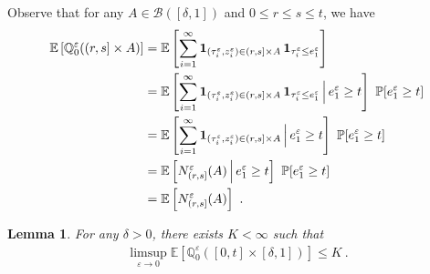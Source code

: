\documentclass[reqno, 12pt, a4paper]{amsart}
\theoremstyle{plain}
\newtheorem{lemma}[theorem]{Lemma}
\theoremstyle{definition}
\begin{document}
Observe that for any $ A \in {\mathcal B} ([\delta, 1])$ and $0\le r\le s \le t$, we have 
\begin{equation}
\label{eq:additivity}
\begin{split}
\mathbb E \left[ \mathbb Q_0^\varepsilon ((r,s] \times A) \right] & = \mathbb E \left[ \sum_{i=1}^\infty {\bf 1}_{(\tau_i^\varepsilon, z_i^\varepsilon) \in (r,s] \times A} \, {\bf 1}_{\tau_i^\varepsilon \le e_1^\varepsilon} \right] \\
& =\mathbb E \left[ \sum_{i=1}^\infty {\bf 1}_{(\tau_i^\varepsilon, z_i^\varepsilon) \in (r,s] \times A} \, {\bf 1}_{\tau_i^\varepsilon \le e_1^\varepsilon} \, \Big \vert \, e_1^ \varepsilon \ge t \right] \ \mathbb P [e_1^\varepsilon \ge t ] \\
& =\mathbb E \left[ \sum_{i=1}^\infty {\bf 1}_{(\tau_i^\varepsilon, z_i^\varepsilon) \in (r,s] \times A} \, \Big \vert \, e_1^ \varepsilon \ge t \right] \ \mathbb P [e_1^\varepsilon \ge t ] \\
&=\mathbb E \left[ N^\varepsilon_{(r,s]} (A)  \, \Big \vert \, e_1^ \varepsilon \ge t \right] \ \mathbb P [e_1^\varepsilon \ge t ] \\
&= \mathbb E \left[ N^\varepsilon_{(r,s]} (A) \right] \ . 
\end{split}
\end{equation}


\begin{lemma}
\label{lem:tight}
For any $\delta>0$, there exists $K<\infty$ such that 
\begin{equation}
\label{eq:UI}
\begin{split}
\limsup_{\varepsilon \to 0} \mathbb E \left[ \mathbb Q_0^\varepsilon ([0,t] \times [\delta,1]) \right] \le K  \ .
\end{split}
\end{equation}
\end{lemma}
 
\end{document}
